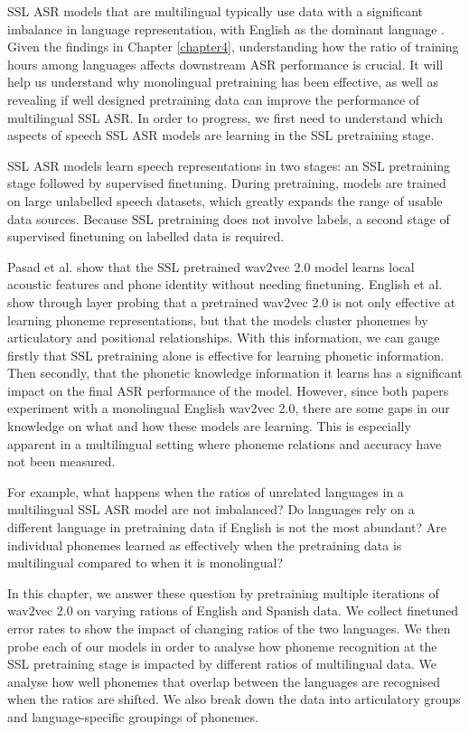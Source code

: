 SSL ASR models that are multilingual typically use data with a significant imbalance in language representation, with English as the dominant language \cite{XLSR-53, babu2021xlsr}. Given the findings in Chapter \ref{chapter4}, understanding how the ratio of training hours among languages affects downstream ASR performance is crucial. It will help us understand why monolingual pretraining has been effective, as well as revealing if well designed pretraining data can improve the performance of multilingual SSL ASR. In order to progress, we first need to understand which aspects of speech SSL ASR models are learning in the SSL pretraining stage.


SSL ASR models learn speech representations in two stages: an SSL pretraining stage followed by supervised finetuning. During pretraining, models are trained on large unlabelled speech datasets, which greatly expands the range of usable data sources. Because SSL pretraining does not involve labels, a second stage of supervised finetuning on labelled data is required.%


Pasad et al. \cite{pasad2021layer} show that the SSL pretrained wav2vec 2.0 model learns local acoustic features and phone identity without needing finetuning. English et al. \cite{english2022domain} show through layer probing that a pretrained wav2vec 2.0 is not only effective at learning phoneme representations, but that the models cluster phonemes by articulatory and positional relationships. With this information, we can gauge firstly that SSL pretraining alone is effective for learning phonetic information. Then secondly, that the phonetic knowledge information it learns has a significant impact on the final ASR performance of the model. However, since both papers experiment with a monolingual English wav2vec 2.0, there are some gaps in our knowledge on what and how these models are learning. This is especially apparent in a multilingual setting where phoneme relations and accuracy have not been measured.

For example, what happens when the ratios of unrelated languages in a multilingual SSL ASR model are not imbalanced? Do languages rely on a different language in pretraining data if English is not the most abundant?  Are individual phonemes learned as effectively when the pretraining data is multilingual compared to when it is monolingual? %


In this chapter, we answer these question by pretraining multiple iterations of wav2vec 2.0 on varying rations of English and Spanish data. We collect finetuned error rates to show the impact of changing ratios of the two languages. We then probe each of our models in order to analyse how phoneme recognition at the SSL pretraining stage is impacted by different ratios of multilingual data. We analyse how well phonemes that overlap between the languages are recognised when the ratios are shifted. We also break down the data into articulatory groups and language-specific groupings of phonemes.

